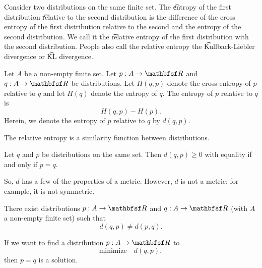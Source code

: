 


Consider two distributions on the same finite set.
The \t{entropy} of the first distribution \t{relative} to the second distribution is the difference of the cross entropy of the first distribution relative to the second and the entropy of the second distribution.
We call it the \t{relative entropy} of the first distribution with the second distribution.
People also call the relative entropy the \t{Kullback-Liebler divergence} or \t{KL divergence}.


Let $A$ be a non-empty finite set.
Let $p: A \to \R$ and $q: A \to \R$ be distributions.
Let $H(q, p)$ denote the cross entropy of $p$ relative to $q$ and let $H(q)$ denote the entropy of $q$.
The entropy of $p$ relative to $q$ is $$H(q, p) - H(p).$$
Herein, we denote the entropy of $p$ relative to $q$ by $d(q, p)$.


The relative entropy is a similarity function between distributions.

\begin{prop}

Let $q$ and $p$ be distributions
on the same set.
Then $d(q, p) \geq 0$ with equality if and only if $p = q$.

\end{prop}

So, $d$ has a few of the properties of a metric.
However, $d$ is not a metric; for example, it is not symmetric.

\begin{prop}
  There exist distributions $p: A \to \R$ and $q: A \to \R$ (with $A$ a non-empty finite set) such that $$d(q, p) \neq d(p, q).$$
\end{prop}


If we want to find a distribution $p: A \to \R$ to
\[
  \text{minimize} \quad d(q, p),
\]
then $p = q$ is a solution.
